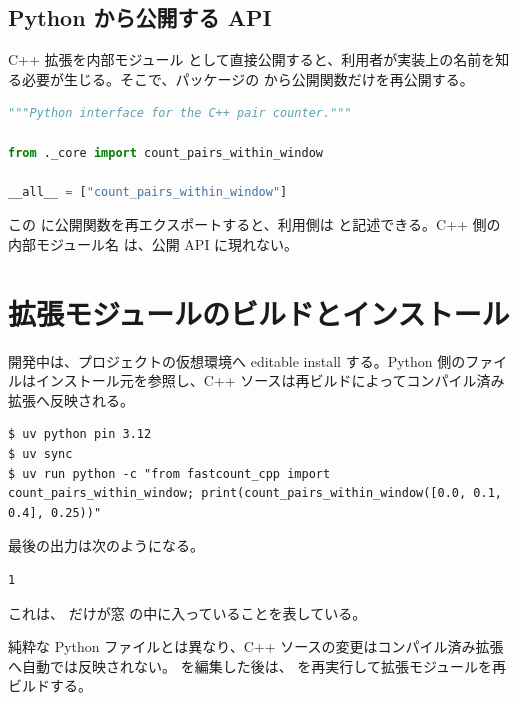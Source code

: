 \subsection{Python から公開する API}

C++ 拡張を内部モジュール  として直接公開すると、利用者が実装上の名前を知る必要が生じる。そこで、パッケージの  から公開関数だけを再公開する。

\begin{lstlisting}[language=Python, title={src/fastcount\_cpp/\_\_init\_\_.py}]
"""Python interface for the C++ pair counter."""

from ._core import count_pairs_within_window

__all__ = ["count_pairs_within_window"]
\end{lstlisting}

この  に公開関数を再エクスポートすると、利用側は  と記述できる。C++ 側の内部モジュール名  は、公開 API に現れない。

\section{拡張モジュールのビルドとインストール}

開発中は、プロジェクトの仮想環境へ editable install する。Python 側のファイルはインストール元を参照し、C++ ソースは再ビルドによってコンパイル済み拡張へ反映される。

\begin{lstlisting}[numbers=none, xleftmargin=2\zw]
$ uv python pin 3.12
$ uv sync
$ uv run python -c "from fastcount_cpp import count_pairs_within_window; print(count_pairs_within_window([0.0, 0.1, 0.4], 0.25))"
\end{lstlisting}

最後の出力は次のようになる。

\begin{lstlisting}[numbers=none, xleftmargin=2\zw]
1
\end{lstlisting}

これは、 だけが窓  の中に入っていることを表している。

純粋な Python ファイルとは異なり、C++ ソースの変更はコンパイル済み拡張へ自動では反映されない。 を編集した後は、 を再実行して拡張モジュールを再ビルドする。

